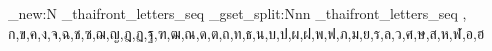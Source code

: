 \usepackage{expl3}
\ExplSyntaxOn
\seq_new:N \g_thaifront_letters_seq
\seq_gset_split:Nnn \g_thaifront_letters_seq { , }
  {ก,ข,ค,ง,จ,ฉ,ช,ซ,ฌ,ญ,ฎ,ฏ,ฐ,ฑ,ฒ,ณ,ด,ต,ถ,ท,ธ,น,บ,ป,ผ,ฝ,พ,ฟ,ภ,ม,ย,ร,ล,ว,ศ,ษ,ส,ห,ฬ,อ,ฮ}
\ExplSyntaxOff

\newcommand{\thaifrontmatter}{%
  \cleardoublepage
  \pagenumbering{arabic}
  \renewcommand{\thepage}{\ThaiFrontPage{\arabic{page}}}%
}
\newcommand{\mainbodymatter}{%
  \cleardoublepage
  \renewcommand{\thepage}{\arabic{page}}%
  \pagenumbering{arabic}%
}

\usepackage[style=apa, backend=biber]{biblatex}


\usepackage{hyperref}
\hypersetup{hidelinks, bookmarksopen=true, pdfstartview=FitH}
